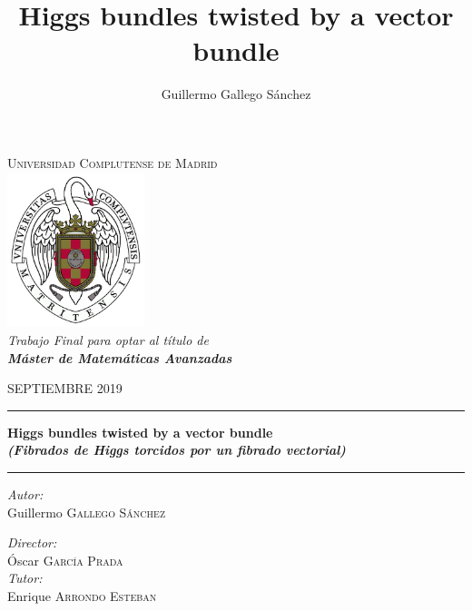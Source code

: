 \documentclass[12pt,a4paper]{book}
\title{Higgs bundles twisted by a vector bundle}
\author{Guillermo Gallego Sánchez}
\date{}
\theoremstyle{definition} \newtheorem{defn}[thm]{Definition}
\theoremstyle{definition} \newtheorem{ejemplo}[thm]{Example}
\theoremstyle{remark} \newtheorem{rem}[thm]{Remark}
\begin{document}

\begin{titlepage}
  \centering
  \LARGE \textsc{Universidad Complutense de Madrid} \\
  \vspace{1cm}
  \includegraphics[width=0.3\textwidth]{logoucm.png} \\
  \vspace{1cm}
  \LARGE \textit{Trabajo Final para optar al título de\\ \textbf{Máster de Matemáticas Avanzadas}} \\
  \vspace{1cm}

\rm \LARGE SEPTIEMBRE 2019

  \vspace{3cm}
  \hrule \vspace{0.5cm}
\Huge \bfseries \sffamily Higgs bundles twisted by a vector bundle \\
  \vspace{1cm}
\rm \Large \sffamily \it (Fibrados de Higgs torcidos por un fibrado vectorial) \\
   \vspace{0.5cm}\hrule

  \vfill

\begin{minipage}{0.5\textwidth}
  \rm \Large
  \textit{Autor:} \\
  Guillermo \textsc{Gallego Sánchez}
 \end{minipage}
 \hfill
\begin{minipage}{0.4\textwidth}
  \rm \large
  \textit{Director:}\\
Óscar \textsc{García Prada} \\
\textit{Tutor:} \\
Enrique \textsc{Arrondo Esteban}
  \end{minipage}
\end{titlepage}
\end{document}
